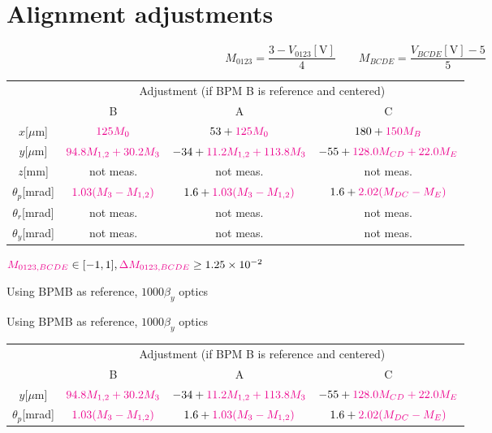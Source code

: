 \documentclass[a4paper,11pt]{book}
\begin{document}
\section{Alignment adjustments}
\begin{equation}
 M_{0123}=\frac{3-V_{0123}[\text{V}]}{4} \qquad M_{BCDE}=\frac{V_{BCDE}[\text{V}]-5}{5}
\end{equation}
{\scriptsize
\begin{tabular}{|c||c|c|c|}\hline
 &\multicolumn{3}{|c|}{Adjustment (if BPM B is reference and centered)}\\\cline{2-4}
 & B & A & C\\\hline\hline
$x$[$\mu$m] & ${\color{magenta}125M_0}$ & $53+{\color{magenta}125M_0}$&${180+\color{magenta}150M_{B}}$\\
$y$[$\mu$m]& ${\color{magenta}94.8M_{1,2}+30.2M_3}$ & $-34+{\color{magenta}11.2M_{1,2}+113.8M_3}$&$-55+{\color{magenta}128.0M_{CD}+22.0M_E}$\\
$z$[mm]& not meas. & not meas.& not meas.\\
$\theta_{p}$[mrad]& ${\color{magenta}1.03(M_3-M_{1,2})}$ & $1.6+{\color{magenta}1.03(M_3-M_{1,2})}$ &$1.6+{\color{magenta} 2.02(M_{DC}-M_E)}$\\
$\theta_{r}$[mrad]& not meas.&not meas.&not meas.\\
$\theta_{y}$[mrad]& not meas.&not meas.&not meas.\\\hline
\end{tabular}}\par
${\color{magenta} M_{0123,BCDE}}\in[-1,1],{\color{magenta}\Delta M_{0123,BCDE}}\geq1.25\times 10^{-2}$\par
{\tiny Using BPMB as reference,  $1000\beta_y$ optics}\par
{\tiny Using BPMB as reference,  $1000\beta_y$ optics}\par
\centering
{\scriptsize
\begin{tabular}{|c||c|c|c|}\hline
 &\multicolumn{3}{|c|}{Adjustment (if BPM B is reference and centered)}\\\cline{2-4}
 & B & A & C\\\hline\hline
$y$[$\mu$m]& ${\color{magenta}94.8M_{1,2}+30.2M_3}$ & $-34+{\color{magenta}11.2M_{1,2}+113.8M_3}$&$-55+{\color{magenta}128.0M_{CD}+22.0M_E}$\\
$\theta_{p}$[mrad]& ${\color{magenta}1.03(M_3-M_{1,2})}$ & $1.6+{\color{magenta}1.03(M_3-M_{1,2})}$ &$1.6+{\color{magenta} 2.02(M_{DC}-M_E)}$\\\hline
\end{tabular}}\par
\end{document}
